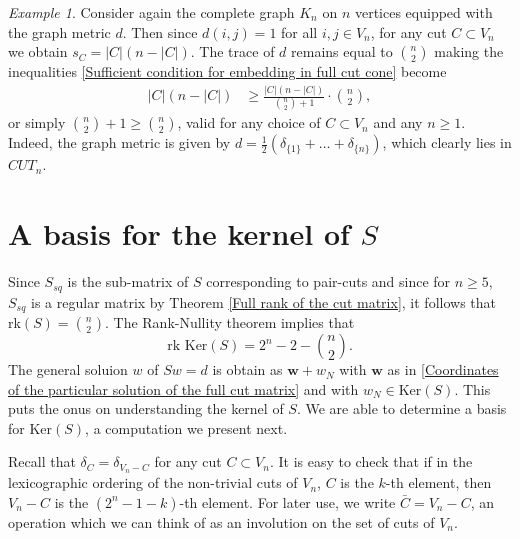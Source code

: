 \documentclass[12pt]{amsart}
\numberwithin{theorem}{section}
\theoremstyle{remark}
\newtheorem{example}[theorem]{Example}
\newcommand{\kerr}{\text{Ker}}
\begin{document}
\begin{example}
Consider again the complete graph $K_n$ on $n$ vertices equipped with the graph metric $d$. Then since $d(i,j)  =1$ for all $i,j\in V_n$, for any cut $C\subset V_n$ we obtain $s_C = |C|(n-|C|)$. The trace of $d$ remains equal to ${n\choose 2}$ making the inequalities \eqref{Sufficient condition for embedding in full cut cone} become 
\begin{align*}
|C|(n-|C|) & \textstyle \ge \frac{|C|(n-|C|)}{{n \choose 2} + 1} \cdot {n\choose 2}, 
\end{align*}
or simply $ {n\choose 2} + 1 \ge {n \choose 2}$, valid for any choice of $C\subset V_n$ and any $n\ge 1$. Indeed, the graph metric is given by $d=\frac{1}{2}\left(\delta_{\{1\}} + \dots + \delta_{\{n\}} \right)$, which clearly lies in $CUT_n$. 
\end{example}


\section{A basis for the kernel of $S$} \label{Section on finding an explicit basis for the full cut-matrix}
Since $S_{sq}$ is the sub-matrix of $S$ corresponding to pair-cuts and since for $n\ge 5$, $S_{sq}$ is a regular matrix by Theorem \ref{Full rank of the cut matrix}, it follows that rk$(S) = {n\choose 2}$. The Rank-Nullity theorem implies that 
\begin{equation} \label{Dimension of the kernel of the full cut matrix}
	\text{rk } \kerr (S) = \textstyle 2^n-2 -{n\choose 2}.
\end{equation}
The general soluion $w$ of $Sw=d$ is obtain as $\mathbf{w} + w_N$ with $\mathbf w$ as in \eqref{Coordinates of the particular solution of the full cut matrix} and with $w_N\in \kerr(S)$. This puts the onus on understanding the kernel of $S$. We are able to determine a basis for $\kerr(S)$, a computation we present next. 

Recall that $\delta_C = \delta_{V_n-C}$ for any cut $C\subset V_n$. It is easy to check that if in the lexicographic ordering of the non-trivial cuts of $V_n$, $C$ is the $k$-th element, then $V_n- C$ is the $(2^n-1-k)$-th element. For later use, we write $\bar C = V_n-C$, an operation which we can think of as an involution on the set of cuts of $V_n$. 
\end{document}
